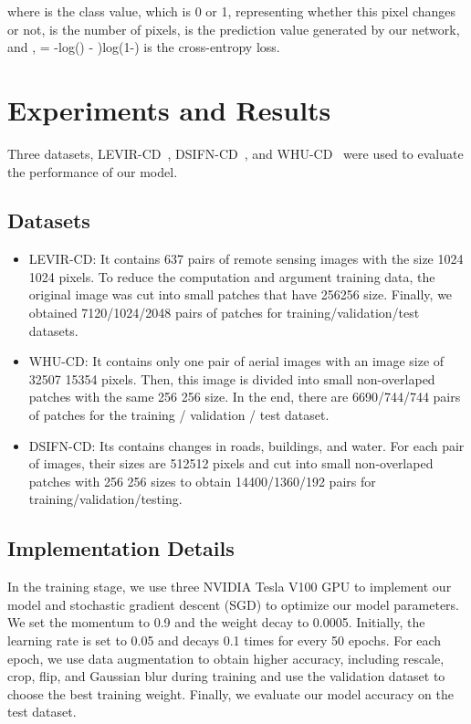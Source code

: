 \documentclass[letterpaper]{article} \usepackage{aaai23}  \usepackage{times}  \usepackage{helvet}  \usepackage{courier}  \usepackage[hyphens]{url}  \usepackage{graphicx} \urlstyle{rm} \def\UrlFont{\rm}  \usepackage{natbib}  \usepackage{caption} \frenchspacing  \setlength{\pdfpagewidth}{8.5in}  \setlength{\pdfpageheight}{11in}  \usepackage{algorithm}
\begin{document}
where  is the class value, which is 0 or 1, representing whether this pixel changes or not,  is the number of pixels,  is the prediction value generated by our network, and ,  = -log() - )log(1-) is the cross-entropy loss.











\section{Experiments and Results}

Three datasets, LEVIR-CD~\cite{rs12101662}, DSIFN-CD~\cite{ZHANG2020183}, and WHU-CD~\cite{aaa8444434} were used to evaluate the performance of our model. 
\subsection{Datasets}

\begin{itemize}
\item LEVIR-CD: It contains 637 pairs of remote sensing images with the size 1024  1024 pixels. To reduce the computation and argument training data, the original image was cut into small patches that have 256256 size. Finally, we obtained 7120/1024/2048 pairs of patches for training/validation/test datasets.
\item WHU-CD: It contains only one pair of aerial images with an image size of 32507  15354 pixels. Then, this image is divided into small non-overlaped patches with the same 256  256 size. In the end, there are 6690/744/744 pairs of patches for the training / validation / test dataset.
\item DSIFN-CD: Its contains changes in roads, buildings, and water. For each pair of images, their sizes are 512512 pixels and cut into small
non-overlaped patches with 256 256 sizes to obtain 14400/1360/192 pairs for training/validation/testing.
\end{itemize}

\subsection{Implementation Details}

In the training stage, we use three NVIDIA Tesla V100 GPU to implement our model and stochastic gradient descent (SGD) to optimize our model parameters. We set the momentum to 0.9 and the weight decay to 0.0005. Initially, the learning rate is set to 0.05 and decays 0.1 times for every 50 epochs. For each epoch, we use data augmentation to obtain higher accuracy, including rescale, crop, flip, and Gaussian blur during training and use the validation dataset to choose the best training weight. Finally, we evaluate our model accuracy on the test dataset.
\end{document}
